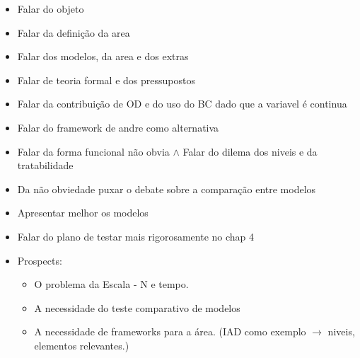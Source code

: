 \documentclass{article}
\begin{document}
\begin{itemize}
\item Falar do objeto
\item Falar da definição da area
\item Falar dos modelos, da area e dos extras
\item Falar de teoria formal e dos pressupostos
\item Falar da contribuição de OD e do uso do BC dado que a variavel é continua
\item Falar do framework de andre como alternativa
\item Falar da forma funcional não obvia $\land$ Falar do dilema dos niveis e da
  tratabilidade
\item Da não obviedade puxar o debate sobre a comparação entre modelos
\item Apresentar melhor os modelos
\item Falar do plano de testar mais rigorosamente no chap 4 
\item Prospects:
  \begin{itemize}
  \item  O problema da Escala  - N e tempo.
  \item A necessidade do teste comparativo de modelos
  \item A necessidade de frameworks para a área. (IAD como exemplo $\rightarrow$ niveis,
    elementos relevantes.)
  \end{itemize}


\end{itemize}
\end{document}
